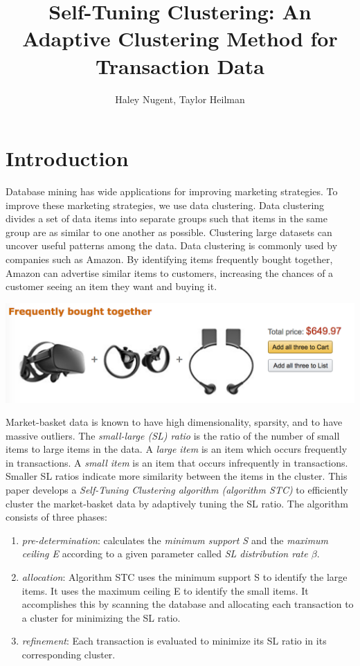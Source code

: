 \documentclass[11pt,reqno]{amsart}
\theoremstyle{definition}
\numberwithin{equation}{subsection}
\begin{document}
\title{Self-Tuning Clustering: An Adaptive Clustering Method for Transaction Data}

\author{Haley Nugent, Taylor Heilman}


\maketitle

\section{Introduction}

Database mining has wide applications for improving marketing strategies. To improve these marketing strategies, we use data clustering. Data clustering divides a set of data items into separate groups such that items in the same group are as similar to one another as possible. Clustering large datasets can uncover useful patterns among the data.  Data clustering is commonly used by companies such as Amazon.  By identifying items frequently bought together, Amazon can advertise similar items to customers, increasing the chances of a customer seeing an item they want and buying it.

\includegraphics[scale=.5]{amazon}

Market-basket data is known to have high dimensionality, sparsity, and to have massive outliers. The {\em small-large (SL) ratio} is the ratio of the number of small items to large items in the data. A {\em large item} is an item which occurs frequently in transactions. A {\em small item} is an item that occurs infrequently in transactions. Smaller SL ratios indicate more similarity between the items in the cluster. This paper develops a {\em Self-Tuning Clustering algorithm (algorithm STC)} to efficiently cluster the market-basket data by adaptively tuning the SL ratio. The algorithm consists of three phases:
	\begin{enumerate}
		\item {\em pre-determination}: calculates the {\em minimum support S} and the {\em maximum ceiling E} according to a given parameter called {\em SL distribution rate $\beta$}.
		
		\item {\em allocation}: Algorithm STC uses the minimum support S to identify the large items. It uses the maximum ceiling E to identify the small items. It accomplishes this by scanning the database and allocating each transaction to a cluster for minimizing the SL ratio.
		
		\item {\em refinement}: Each transaction is evaluated to minimize its SL ratio in its corresponding cluster. 
	\end{enumerate}
	
\end{document}
